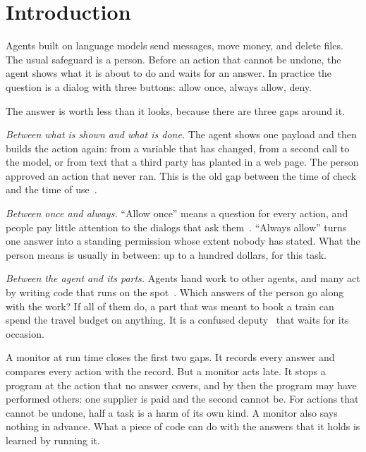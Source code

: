 \documentclass[acmsmall,nonacm,screen]{acmart}
\begin{document}
\authorsaddresses{}

\maketitle

\section{Introduction}

Agents built on language models send messages, move money, and delete files. The usual
safeguard is a person. Before an action that cannot be undone, the agent shows what it is
about to do and waits for an answer. In practice the question is a dialog with three buttons:
allow once, always allow, deny.

The answer is worth less than it looks, because there are three gaps around it.

\emph{Between what is shown and what is done.} The agent shows one payload and then builds the
action again: from a variable that has changed, from a second call to the model, or from text
that a third party has planted in a web page. The person approved an action that never ran.
This is the old gap between the time of check and the time of use~\citep{mcphee1974}.

\emph{Between once and always.} ``Allow once'' means a question for every action, and people
pay little attention to the dialogs that ask them~\citep{felt2012}. ``Always allow'' turns one
answer into a standing permission whose extent nobody has stated. What the person means is
usually in between: up to a hundred dollars, for this task.

\emph{Between the agent and its parts.} Agents hand work to other agents, and many act by
writing code that runs on the spot~\citep{wang2024}. Which answers of the person go along with
the work? If all of them do, a part that was meant to book a train can spend the travel budget
on anything. It is a confused deputy~\citep{hardy1988} that waits for its occasion.

A monitor at run time closes the first two gaps. It records every answer and compares every
action with the record. But a monitor acts late. It stops a program at the action that no
answer covers, and by then the program may have performed others: one supplier is paid and the
second cannot be. For actions that cannot be undone, half a task is a harm of its own kind. A
monitor also says nothing in advance. What a piece of code can do with the answers that it
holds is learned by running it.
\end{document}
